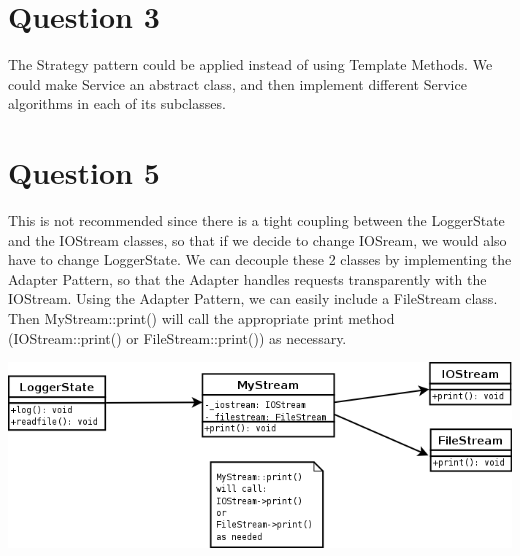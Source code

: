 \documentclass{article}[12pt]
\begin{document}
\section*{Question 3}
The Strategy pattern could be applied instead of using Template Methods. We could make Service an abstract class, and then implement
different Service algorithms in each of its subclasses. 

\section*{Question 5}
This is not recommended since there is a tight coupling between the LoggerState and the IOStream classes, so that if we decide
to change IOSream, we would also have to change LoggerState. We can decouple these 2 classes by implementing the Adapter Pattern,
so that the Adapter handles requests transparently with the IOStream. Using the Adapter Pattern, we can easily include a FileStream
class. Then MyStream::print() will call the appropriate print method (IOStream::print() or FileStream::print()) as necessary.

\includegraphics[scale=0.45]{a4q5.png}
\end{document}
